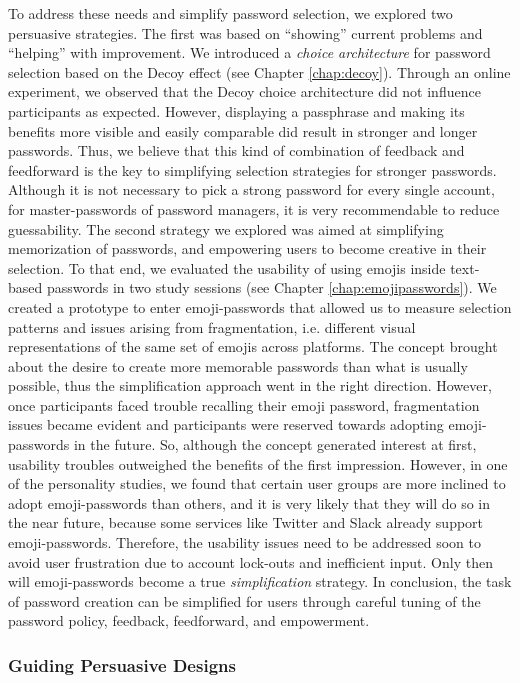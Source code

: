 To address these needs and simplify password selection, we explored two persuasive strategies. The first was based on ``showing'' current problems and ``helping'' with improvement. We introduced a \textit{choice architecture} for password selection based on the Decoy effect (see Chapter \ref{chap:decoy}). Through an online experiment, we observed that the Decoy choice architecture did not influence participants as expected. However, displaying a passphrase and making its benefits more visible and easily comparable did result in stronger and longer passwords. Thus, we believe that this kind of combination of feedback and feedforward is the key to simplifying selection strategies for stronger passwords. Although it is not necessary to pick a strong password for every single account, for master-passwords of password managers, it is very recommendable to reduce guessability. The second strategy we explored was aimed at simplifying memorization of passwords, and empowering users to become creative in their selection. To that end, we evaluated the usability of using emojis inside text-based passwords in two study sessions (see Chapter \ref{chap:emojipasswords}). We created a prototype to enter emoji-passwords that allowed us to measure selection patterns and issues arising from fragmentation, i.e. different visual representations of the same set of emojis across platforms. The concept brought about the desire to create more memorable passwords than what is usually possible, thus the simplification approach went in the right direction. However, once participants faced trouble recalling their emoji password, fragmentation issues became evident and participants were reserved towards adopting emoji-passwords in the future. So, although the concept generated interest at first, usability troubles outweighed the benefits of the first impression. However, in one of the personality studies, we found that certain user groups are more inclined to adopt emoji-passwords than others, and it is very likely that they will do so in the near future, because some services like Twitter and Slack already support emoji-passwords. Therefore, the usability issues need to be addressed soon to avoid user frustration due to account lock-outs and inefficient input. Only then will emoji-passwords become a true \textit{simplification} strategy. In conclusion, the task of password creation can be simplified for users through careful tuning of the password policy, feedback, feedforward, and empowerment. 

\subsubsection{Guiding Persuasive Designs}

